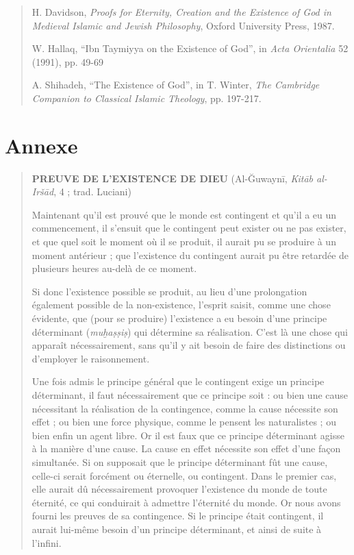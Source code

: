 \begin{quote}
H. Davidson, \emph{Proofs for Eternity, Creation and the Existence of
God in Medieval Islamic and Jewish Philosophy}, Oxford University Press,
1987.

W. Hallaq, ``Ibn Taymiyya on the Existence of God'', in \emph{Acta
Orientalia} 52 (1991), pp. 49-69

A. Shihadeh, ``The Existence of God'', in T. Winter, \emph{The Cambridge
Companion to Classical Islamic Theology}, pp. 197-217.
\end{quote}

\hypertarget{annexe}{%
\section{Annexe}\label{annexe}}

\begin{quote}
\textbf{PREUVE DE L'EXISTENCE DE DIEU} (Al-Ğuwaynī, \emph{Kitāb
al-Iršād}, 4 ; trad. Luciani)

Maintenant qu'il est prouvé que le monde est contingent et qu'il a eu un
commencement, il s'ensuit que le contingent peut exister ou ne pas
exister, et que quel soit le moment où il se produit, il aurait pu se
produire à un moment antérieur ; que l'existence du contingent aurait pu
être retardée de plusieurs heures au-delà de ce moment.

Si donc l'existence possible se produit, au lieu d'une prolongation
également possible de la non-existence, l'esprit saisit, comme une chose
évidente, que (pour se produire) l'existence a eu besoin d'une principe
déterminant (\emph{muḫaṣṣiṣ}) qui détermine sa réalisation. C'est là une
chose qui apparaît nécessairement, sans qu'il y ait besoin de faire des
distinctions ou d'employer le raisonnement.

Une fois admis le principe général que le contingent exige un principe
déterminant, il faut nécessairement que ce principe soit : ou bien une
cause nécessitant la réalisation de la contingence, comme la cause
nécessite son effet ; ou bien une force physique, comme le pensent les
naturalistes ; ou bien enfin un agent libre. Or il est faux que ce
principe déterminant agisse à la manière d'une cause. La cause en effet
nécessite son effet d'une façon simultanée. Si on supposait que le
principe déterminant fût une cause, celle-ci serait forcément ou
éternelle, ou contingent. Dans le premier cas, elle aurait dû
nécessairement provoquer l'existence du monde de toute éternité, ce qui
conduirait à admettre l'éternité du monde. Or nous avons fourni les
preuves de sa contingence. Si le principe était contingent, il aurait
lui-même besoin d'un principe déterminant, et ainsi de suite à l'infini.


\end{quote}
